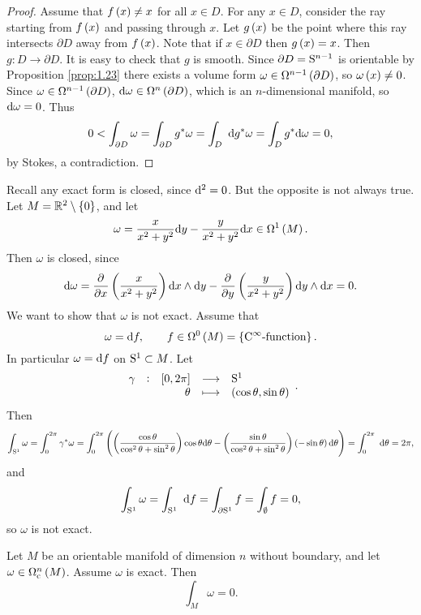 \begin{proof}
Assume that $ f\br{x} \ne x $ for all $ x \in D $. For any $ x \in D $, consider the ray starting from $ f\br{x} $ and passing through $ x $. Let $ g\br{x} $ be the point where this ray intersects $ \partial D $ away from $ f\br{x} $. Note that if $ x \in \partial D $ then $ g\br{x} = x $. Then $ g : D \to \partial D $. It is easy to check that $ g $ is smooth. Since $ \partial D = \S^{n - 1} $ is orientable by Proposition \ref{prop:1.23} there exists a volume form $ \omega \in \Omega^{n - 1}\br{\partial D} $, so $ \omega\br{x} \ne 0 $. Since $ \omega \in \Omega^{n - 1}\br{\partial D} $, $ \d\omega \in \Omega^n\br{\partial D} $, which is an $ n $-dimensional manifold, so $ \d\omega = 0 $. Thus
$$ 0 < \int_{\partial D} \omega = \int_{\partial D} g^*\omega = \intd{D}{}{}{g^*\omega} = \int_D g^*\d\omega = 0, $$
by Stokes, a contradiction.
\end{proof}

\begin{example}
Recall any exact form is closed, since $ \d^2 = 0 $. But the opposite is not always true. Let $ M = \RR^2 \setminus \cbr{0} $, and let
$$ \omega = \dfrac{x}{x^2 + y^2} \d y - \dfrac{y}{x^2 + y^2} \d x \in \Omega^1\br{M}. $$
Then $ \omega $ is closed, since
$$ \d\omega = \dpd{}{x}\br{\dfrac{x}{x^2 + y^2}} \d x \wedge \d y - \dpd{}{y}\br{\dfrac{y}{x^2 + y^2}} \d y \wedge \d x = 0. $$
We want to show that $ \omega $ is not exact. Assume that
$$ \omega = \d f, \qquad f \in \Omega^0\br{M} = \cbr{\text{$ \C^\infty $-function}}. $$
In particular $ \omega = \d f $ on $ \S^1 \subset M $. Let
$$ \function[\gamma]{\sbr{0, 2\pi}}{\S^1}{\theta}{\br{\cos \theta, \sin \theta}}. $$
Then
$$ \int_{\S^1} \omega = \int_0^{2\pi} \gamma^*\omega = \int_0^{2\pi} \br{\br{\dfrac{\cos \theta}{\cos^2 \theta + \sin^2 \theta}}\cos \theta \d\theta - \br{\dfrac{\sin \theta}{\cos^2 \theta + \sin^2 \theta}}\br{-\sin \theta} \d\theta} = \intd{0}{2\pi}{}{\theta} = 2\pi, $$
and
$$ \int_{\S^1} \omega = \intd{\S^1}{}{}{f} = \int_{\partial\S^1} f = \int_\emptyset f = 0, $$
so $ \omega $ is not exact.
\end{example}

\pagebreak

\begin{proposition}
Let $ M $ be an orientable manifold of dimension $ n $ without boundary, and let $ \omega \in \Omega_\c^n\br{M} $. Assume $ \omega $ is exact. Then
$$ \int_M \omega = 0. $$
\end{proposition}

